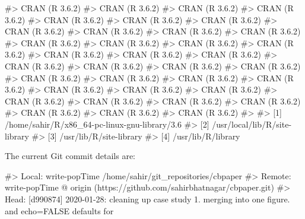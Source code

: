 \documentclass[
]{jss}
\begin{document}
\begin{CodeChunk}
\begin{CodeOutput}
#>  CRAN (R 3.6.2)                          
#>  CRAN (R 3.6.2)                          
#>  CRAN (R 3.6.2)                          
#>  CRAN (R 3.6.2)                          
#>  CRAN (R 3.6.2)                          
#>  CRAN (R 3.6.2)                          
#>  CRAN (R 3.6.2)                          
#>  CRAN (R 3.6.2)                          
#>  CRAN (R 3.6.2)                          
#>  CRAN (R 3.6.2)                          
#>  CRAN (R 3.6.2)                          
#>  CRAN (R 3.6.2)                          
#>  CRAN (R 3.6.2)                          
#>  CRAN (R 3.6.2)                          
#>  CRAN (R 3.6.2)                          
#>  CRAN (R 3.6.2)                          
#>  CRAN (R 3.6.2)                          
#>  CRAN (R 3.6.2)                          
#>  CRAN (R 3.6.2)                          
#>  CRAN (R 3.6.2)                          
#>  CRAN (R 3.6.2)                          
#>  CRAN (R 3.6.2)                          
#>  CRAN (R 3.6.2)                          
#>  CRAN (R 3.6.2)                          
#>  CRAN (R 3.6.2)                          
#>  CRAN (R 3.6.2)                          
#>  CRAN (R 3.6.2)                          
#>  CRAN (R 3.6.2)                          
#>  CRAN (R 3.6.2)                          
#>  CRAN (R 3.6.2)                          
#>  CRAN (R 3.6.2)                          
#>  CRAN (R 3.6.2)                          
#>  CRAN (R 3.6.2)                          
#>  CRAN (R 3.6.2)                          
#>  CRAN (R 3.6.2)                          
#>  CRAN (R 3.6.2)                          
#> 
#> [1] /home/sahir/R/x86_64-pc-linux-gnu-library/3.6
#> [2] /usr/local/lib/R/site-library
#> [3] /usr/lib/R/site-library
#> [4] /usr/lib/R/library
\end{CodeOutput}
\end{CodeChunk}

The current Git commit details are:

\begin{CodeChunk}

\begin{CodeOutput}
#> Local:    write-popTime /home/sahir/git_repositories/cbpaper
#> Remote:   write-popTime @ origin (https://github.com/sahirbhatnagar/cbpaper.git)
#> Head:     [d990874] 2020-01-28: cleaning up case study 1. merging into one figure. and echo=FALSE defaults for
\end{CodeOutput}
\end{CodeChunk}


\end{document}
